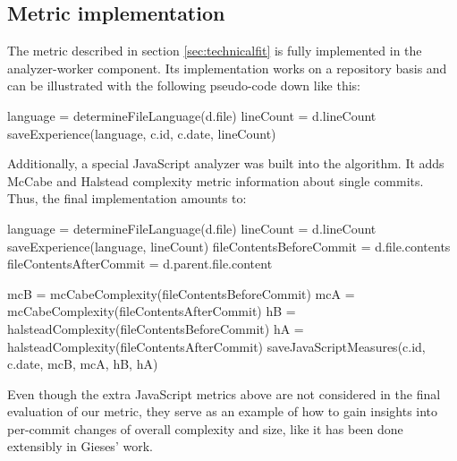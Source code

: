 \subsection{Metric implementation}\label{sec:metric-implementation}
The metric described in section \ref{sec:technicalfit} is fully implemented in the analyzer-worker component. Its implementation works on a repository basis and can be illustrated with the following pseudo-code down like this:\\[.25em]

\begin{algorithmic}
    \State language = determineFileLanguage(d.file)
    \State lineCount = d.lineCount
    \State saveExperience(language, c.id, c.date, lineCount)
  \EndFor
\EndFor
\end{algorithmic}
\vspace{0.75em}

Additionally, a special JavaScript analyzer was built into the algorithm. It adds McCabe\cite{mc:1976} and Halstead\cite{h:1977} complexity metric information about single commits. Thus, the final implementation amounts to:\\[.25em]

\begin{minipage}{\linewidth}
\begin{algorithmic}
    \State language = determineFileLanguage(d.file)
    \State lineCount = d.lineCount
    \State saveExperience(language, lineCount)
    \State
      \State fileContentsBeforeCommit = d.file.contents
      \State fileContentsAfterCommit  = d.parent.file.content

      \State mcB = mcCabeComplexity(fileContentsBeforeCommit)
      \State mcA = mcCabeComplexity(fileContentsAfterCommit)
      \State hB = halsteadComplexity(fileContentsBeforeCommit)
      \State hA = halsteadComplexity(fileContentsAfterCommit)
      \State
      \State saveJavaScriptMeasures(c.id, c.date, mcB, mcA, hB, hA)
    \EndIf
  \EndFor
\EndFor
\end{algorithmic}
\end{minipage}
\vspace{0.75em}

Even though the extra JavaScript metrics above are not considered in the final evaluation of our metric, they serve as an example of how to gain insights into per-commit changes of overall complexity and size, like it has been done extensibly in Gieses' work\cite{pg:2014}.

